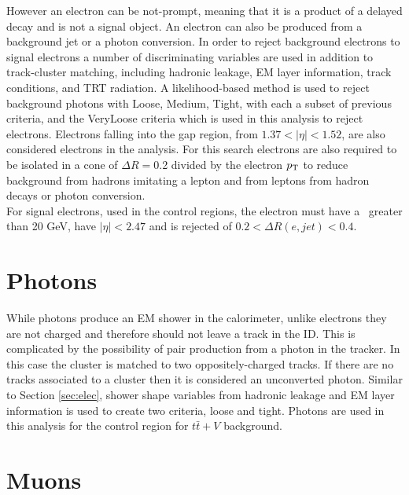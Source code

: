 However an electron can be not-prompt, meaning that it is a product of a delayed decay and is not a signal object. An electron can also be produced from a background jet or a photon conversion.  In order to reject background electrons to signal electrons a number of discriminating variables are used in addition to track-cluster matching, including hadronic leakage, EM layer information, track conditions, and TRT radiation. A likelihood-based method is used to reject background photons with Loose, Medium, Tight, with each a subset of previous criteria, and the VeryLoose criteria which is used in this analysis to reject electrons.  Electrons falling into the gap region, from $1.37 < |\eta| < 1.52$, are also considered electrons in the analysis.  For this search electrons are also required to be isolated in a cone of $\Delta R=$0.2 divided by the electron $p_{\mathrm{T}}$ to reduce background from hadrons imitating a lepton and from leptons from hadron decays or photon conversion.  \\

For signal electrons, used in the control regions, the electron must have a \pt\ greater than 20 GeV, have $|\eta |<2.47$ and is rejected of $0.2<\Delta R(e,jet)<0.4$.  \\



\section{Photons}

While photons produce an EM shower in the calorimeter, unlike electrons they are not charged and therefore should not leave a track in the ID.  This is complicated by the possibility of pair production from a photon in the tracker.  In this case the cluster is matched to two oppositely-charged tracks.  If there are no tracks associated to a cluster then it is considered an unconverted photon.  Similar to Section \ref{sec:elec}, shower shape variables from hadronic leakage and EM layer information is used\cite{ATL-PHYS-PUB-2016-014} to create two criteria, loose and tight.  Photons are used in this analysis for the control region for $t\bar{t}+V$ background.

\section{Muons}
\label{section:muons}

